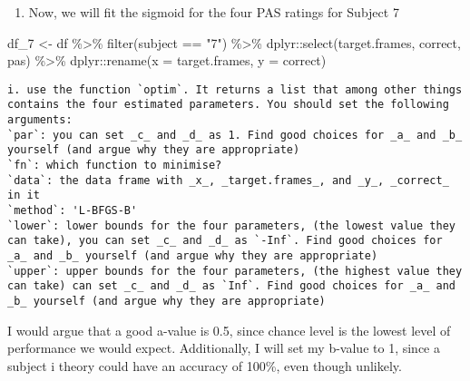 \documentclass[
]{article}
\newenvironment{Shaded}{\begin{snugshade}}{\end{snugshade}}
\newcommand{\AttributeTok}[1]{\textcolor[rgb]{0.77,0.63,0.00}{#1}}
\newcommand{\FunctionTok}[1]{\textcolor[rgb]{0.00,0.00,0.00}{#1}}
\newcommand{\NormalTok}[1]{#1}
\newcommand{\OtherTok}[1]{\textcolor[rgb]{0.56,0.35,0.01}{#1}}
\newcommand{\SpecialCharTok}[1]{\textcolor[rgb]{0.00,0.00,0.00}{#1}}
\newcommand{\StringTok}[1]{\textcolor[rgb]{0.31,0.60,0.02}{#1}}
\providecommand{\tightlist}{%
  \setlength{\itemsep}{0pt}\setlength{\parskip}{0pt}}
\begin{document}
\begin{enumerate}
\def\labelenumi{\arabic{enumi})}
\tightlist
\item
  Now, we will fit the sigmoid for the four PAS ratings for Subject 7
\end{enumerate}

\begin{Shaded}
\begin{Highlighting}[]
\NormalTok{df\_7 }\OtherTok{\textless{}{-}}\NormalTok{ df }\SpecialCharTok{\%\textgreater{}\%} 
  \FunctionTok{filter}\NormalTok{(subject }\SpecialCharTok{==} \StringTok{"7"}\NormalTok{) }\SpecialCharTok{\%\textgreater{}\%} 
\NormalTok{  dplyr}\SpecialCharTok{::}\FunctionTok{select}\NormalTok{(target.frames, correct, pas) }\SpecialCharTok{\%\textgreater{}\%} 
\NormalTok{  dplyr}\SpecialCharTok{::}\FunctionTok{rename}\NormalTok{(}\AttributeTok{x =}\NormalTok{ target.frames, }\AttributeTok{y =}\NormalTok{ correct)}
\end{Highlighting}
\end{Shaded}

\begin{verbatim}
i. use the function `optim`. It returns a list that among other things contains the four estimated parameters. You should set the following arguments:  
`par`: you can set _c_ and _d_ as 1. Find good choices for _a_ and _b_ yourself (and argue why they are appropriate)  
`fn`: which function to minimise?  
`data`: the data frame with _x_, _target.frames_, and _y_, _correct_ in it  
`method`: 'L-BFGS-B'  
`lower`: lower bounds for the four parameters, (the lowest value they can take), you can set _c_ and _d_ as `-Inf`. Find good choices for _a_ and _b_ yourself (and argue why they are appropriate)  
`upper`: upper bounds for the four parameters, (the highest value they can take) can set _c_ and _d_ as `Inf`. Find good choices for _a_ and _b_ yourself (and argue why they are appropriate)
\end{verbatim}

I would argue that a good a-value is 0.5, since chance level is the
lowest level of performance we would expect. Additionally, I will set my
b-value to 1, since a subject i theory could have an accuracy of 100\%,
even though unlikely.
\end{document}
